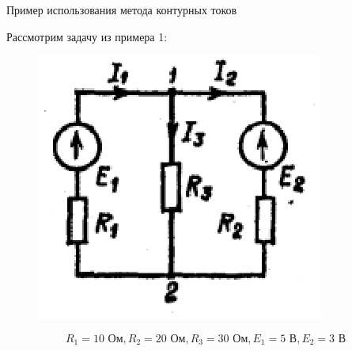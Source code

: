 \documentclass[10pt, pdf, hyperref={unicode},handout]{beamer}
\begin{document}
\begin{frame}{Пример использования метода контурных токов}
  \begin{block}

    \small{
      Рассмотрим задачу из примера 1:
\begin{figure}[htb] 
    \centering
    \includegraphics [scale=1.3]{ris2.eps}
  \end{figure}
   $$R_1=10 \text{ Ом}, R_2=20 \text{ Ом}, R_3=30 \text{ Ом}, E_1=5 \text{ В}, E_2=3 \text{ В}$$   
      }
  \end{block}
  
\end{frame}
\end{document}
